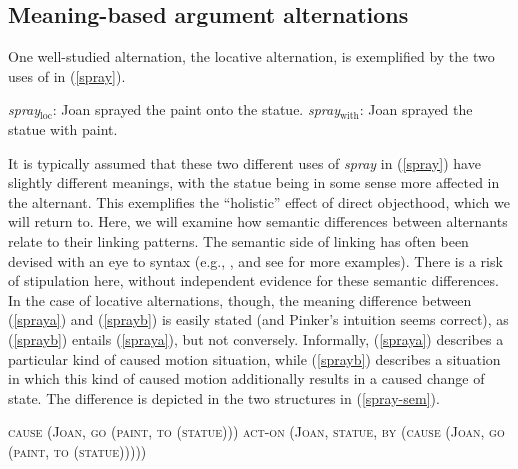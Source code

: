 \documentclass[output=paper
 	        ,biblatex
                ,babelshorthands
                ,newtxmath
                ,draftmode
                ,colorlinks, citecolor=brown
]{langscibook}
\begin{document}
\subsection{Meaning-based argument alternations}

One well-studied alternation, the locative alternation, is exemplified by the two uses of  in (\ref{spray}).

\begin{exe}
\ex \label{spray}
\begin{xlist}
\ex \label{spraya} \textit{spray$_{\text{loc}}$}: Joan sprayed the paint onto the statue.
\ex \label{sprayb} \textit{spray$_{\text{with}}$}: Joan sprayed the statue with paint.
\end{xlist}
\end{exe}

\noindent
It is typically assumed that these two different uses of \textit{spray} in (\ref{spray}) have
slightly different meanings, with the statue being in some sense more affected in the 
alternant.  This exemplifies the ``holistic'' effect of direct objecthood, which we will return to.  Here, we will examine how semantic differences
between alternants relate to their linking patterns.  The semantic side of linking has often been
devised with an eye to syntax (e.g., \citealt{Pinker1989}, and see \citealt{KoenigandDavis2006} for
more examples).  There is a risk of stipulation here, without independent evidence for these
semantic differences.  In the case of locative alternations, though, the meaning difference between
(\ref{spraya}) and (\ref{sprayb}) is easily stated (and Pinker's intuition seems correct), as
(\ref{sprayb}) entails (\ref{spraya}), but not conversely.  Informally, (\ref{spraya}) describes a
particular kind of caused motion situation, while (\ref{sprayb}) describes a situation in which
this kind of caused motion additionally results in a caused change of state.  The difference is
depicted in the two structures in (\ref{spray-sem}).

\begin{exe}\ex\label{spray-sem}
\begin{xlist}
\ex \label{spray-sema} \textsc{cause (Joan, go (paint, to (statue)))}
\ex \label{spray-semb} \textsc{act-on (Joan, statue, by (cause (Joan, go (paint, to (statue)))))}
\end{xlist}
\end{exe}
\end{document}
